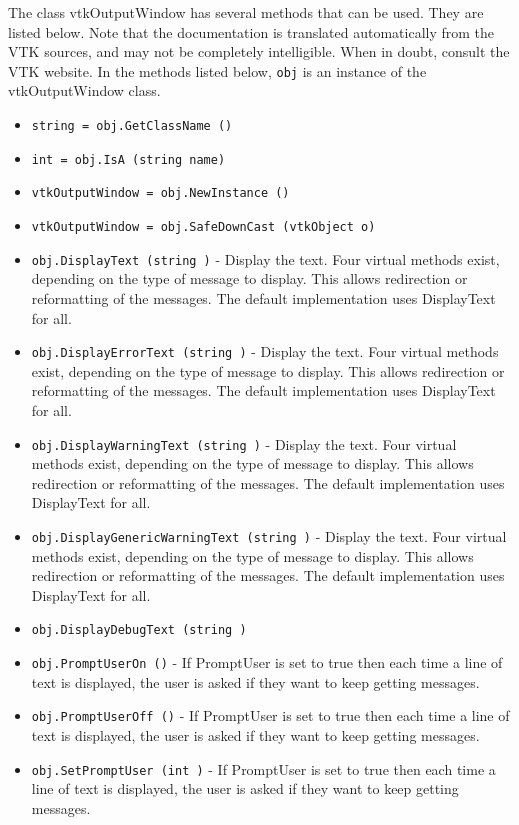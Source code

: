 The class vtkOutputWindow has several methods that can be used.
  They are listed below.
Note that the documentation is translated automatically from the VTK sources,
and may not be completely intelligible.  When in doubt, consult the VTK website.
In the methods listed below, \verb|obj| is an instance of the vtkOutputWindow class.
\begin{itemize}
\item  \verb|string = obj.GetClassName ()|

\item  \verb|int = obj.IsA (string name)|

\item  \verb|vtkOutputWindow = obj.NewInstance ()|

\item  \verb|vtkOutputWindow = obj.SafeDownCast (vtkObject o)|

\item  \verb|obj.DisplayText (string )| -  Display the text. Four virtual methods exist, depending on the type of
 message to display. This allows redirection or reformatting of the
 messages. The default implementation uses DisplayText for all.

\item  \verb|obj.DisplayErrorText (string )| -  Display the text. Four virtual methods exist, depending on the type of
 message to display. This allows redirection or reformatting of the
 messages. The default implementation uses DisplayText for all.

\item  \verb|obj.DisplayWarningText (string )| -  Display the text. Four virtual methods exist, depending on the type of
 message to display. This allows redirection or reformatting of the
 messages. The default implementation uses DisplayText for all.

\item  \verb|obj.DisplayGenericWarningText (string )| -  Display the text. Four virtual methods exist, depending on the type of
 message to display. This allows redirection or reformatting of the
 messages. The default implementation uses DisplayText for all.

\item  \verb|obj.DisplayDebugText (string )|

\item  \verb|obj.PromptUserOn ()| -  If PromptUser is set to true then each time a line of text
 is displayed, the user is asked if they want to keep getting
 messages.

\item  \verb|obj.PromptUserOff ()| -  If PromptUser is set to true then each time a line of text
 is displayed, the user is asked if they want to keep getting
 messages.

\item  \verb|obj.SetPromptUser (int )| -  If PromptUser is set to true then each time a line of text
 is displayed, the user is asked if they want to keep getting
 messages.

\end{itemize}
